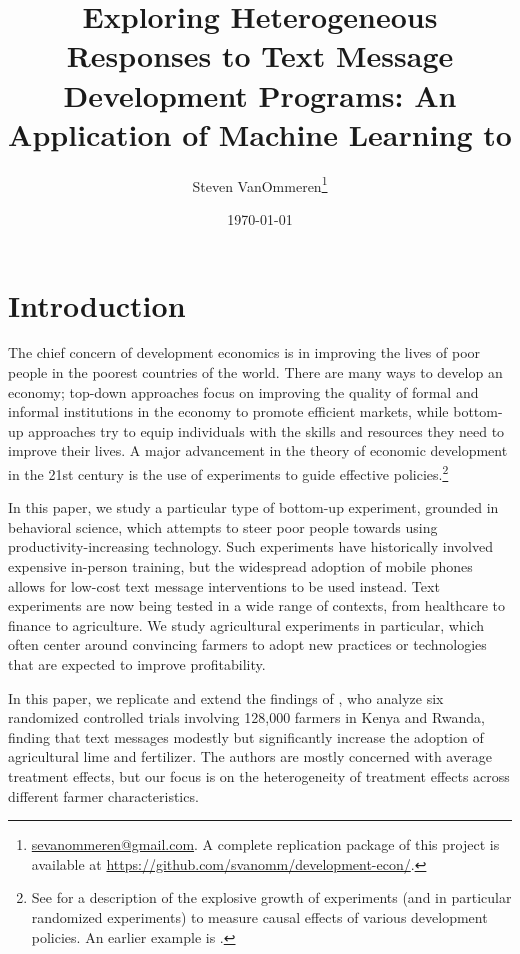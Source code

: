 \documentclass[12pt]{article}
\begin{document}
\title{Exploring Heterogeneous Responses to Text Message Development Programs: An Application of Machine Learning to \textcite{fabregas_digital_2025}}
\author{Steven VanOmmeren\thanks{\href{mailto:sevanommeren@gmail.com}{sevanommeren@gmail.com}. A complete replication package of this project is available at \url{https://github.com/svanomm/development-econ/}.}}
\date{\today}
\maketitle
\noindent
\small
\tableofcontents
\newpage

\doublespacing
\normalsize

\section{Introduction}

The chief concern of development economics is in improving the lives of poor people in the poorest countries of the world. There are many ways to develop an economy; top-down approaches focus on improving the quality of formal and informal institutions in the economy to promote efficient markets, while bottom-up approaches try to equip individuals with the skills and resources they need to improve their lives. A major advancement in the theory of economic development in the 21st century is the use of experiments to guide effective policies.\footnote{See \textcite{basu_influence_2020} for a description of the explosive growth of experiments (and in particular randomized experiments) to measure causal effects of various development policies. An earlier example is \textcite{duflo_use_2003}.} 

In this paper, we study a particular type of bottom-up experiment, grounded in behavioral science, which attempts to steer poor people towards using productivity-increasing technology. Such experiments have historically involved expensive in-person training, but the widespread adoption of mobile phones allows for low-cost text message interventions to be used instead. Text experiments are now being tested in a wide range of contexts, from healthcare to finance to agriculture. We study agricultural experiments in particular, which often center around convincing farmers to adopt new practices or technologies that are expected to improve profitability.

In this paper, we replicate and extend the findings of \textcite{fabregas_digital_2025}, who analyze six randomized controlled trials involving 128,000 farmers in Kenya and Rwanda, finding that text messages modestly but significantly increase the adoption of agricultural lime and fertilizer. The authors are mostly concerned with average treatment effects, but our focus is on the heterogeneity of treatment effects across different farmer characteristics.
\end{document}
